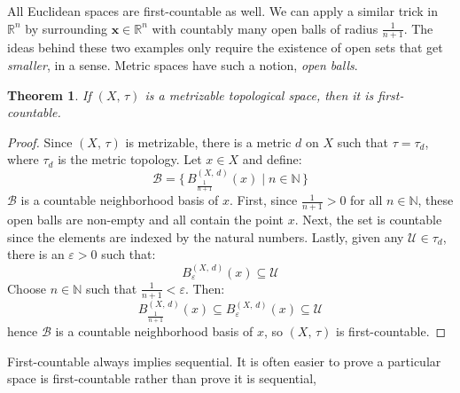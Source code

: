 \documentclass{article}
\theoremstyle{plain}
\newtheorem{theorem}{Theorem}[section]
\theoremstyle{normal}
\newenvironment{example}{%
    \pushQED{\qed}\renewcommand{\qedsymbol}{$\blacksquare$}\examplex%
}{%
    \popQED\endexamplex%
}
\begin{document}
        \begin{example}
            All Euclidean spaces are first-countable as well. We can apply a
            similar trick in $\mathbb{R}^{n}$ by surrounding
            $\mathbf{x}\in\mathbb{R}^{n}$ with countably many open balls of
            radius $\frac{1}{n+1}$.
        \end{example}
        The ideas behind these two examples only require the existence of
        open sets that get \textit{smaller}, in a sense. Metric spaces have
        such a notion, \textit{open balls}.
        \begin{theorem}
            If $(X,\,\tau)$ is a metrizable topological space, then
            it is first-countable.
        \end{theorem}
        \begin{proof}
            Since $(X,\,\tau)$ is metrizable, there is a metric $d$ on $X$ such
            that $\tau=\tau_{d}$, where $\tau_{d}$ is the metric topology. Let
            $x\in{X}$ and define:
            \begin{equation}
                \mathcal{B}=\{\,B_{\frac{1}{n+1}}^{(X,\,d)}(x)\;|\;
                    n\in\mathbb{N}\,\}
            \end{equation}
            $\mathcal{B}$ is a countable neighborhood basis of $x$. First, since
            $\frac{1}{n+1}>0$ for all $n\in\mathbb{N}$, these open balls are
            non-empty and all contain the point $x$. Next, the set is countable
            since the elements are indexed by the natural numbers. Lastly,
            given any $\mathcal{U}\in\tau_{d}$, there is an
            $\varepsilon>0$ such that:
            \begin{equation}
                B_{\varepsilon}^{(X,\,d)}(x)\subseteq\mathcal{U}
            \end{equation} 
            Choose $n\in\mathbb{N}$ such that $\frac{1}{n+1}<\varepsilon$. Then:
            \begin{equation}
                B_{\frac{1}{n+1}}^{(X,\,d)}(x)
                \subseteq{B}_{\varepsilon}^{(X,\,d)}(x)
                \subseteq\mathcal{U}
            \end{equation}
            hence $\mathcal{B}$ is a countable neighborhood basis of $x$,
            so $(X,\,\tau)$ is first-countable.
        \end{proof}
        First-countable always implies sequential. It is often easier to prove a
        particular space is first-countable rather than prove it is sequential,
\end{document}

